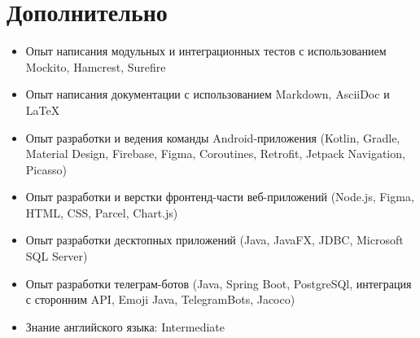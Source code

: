 \documentclass[a4paper,9pt]{report}
\newcommand{\bulletItem}[1]{\item[$\bullet$] #1}
\begin{document}
\section{Дополнительно}

\begin{itemize}
\bulletItem{Опыт написания модульных и интеграционных тестов с использованием Mockito, Hamcrest, Surefire}
\bulletItem{Опыт написания документации с использованием Markdown, AsciiDoc и LaTeX}
\bulletItem{Опыт разработки и ведения команды Android-приложения (Kotlin, Gradle, Material Design, Firebase, Figma, Coroutines, Retrofit, Jetpack Navigation, Picasso)}
\bulletItem{Опыт разработки и верстки фронтенд-части веб-приложений (Node.js, Figma, HTML, CSS, Parcel, Chart.js)}
\bulletItem{Опыт разработки десктопных приложений (Java, JavaFX, JDBC, Microsoft SQL Server)}
\bulletItem{Опыт разработки телеграм-ботов (Java, Spring Boot, PostgreSQl, интеграция с сторонним API, Emoji Java, TelegramBots, Jacoco)}
\bulletItem{Знание английского языка: Intermediate}
\end{itemize}
\end{document}
